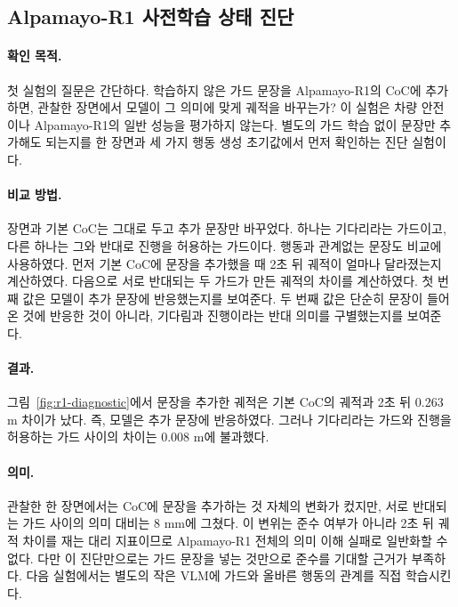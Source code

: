 
\subsection{Alpamayo-R1 사전학습 상태 진단}

\paragraph{확인 목적.}
첫 실험의 질문은 간단하다. 학습하지 않은 가드 문장을 Alpamayo-R1의 CoC에 추가하면, 관찰한 장면에서 모델이 그 의미에 맞게 궤적을 바꾸는가? 이 실험은 차량 안전이나 Alpamayo-R1의 일반 성능을 평가하지 않는다. 별도의 가드 학습 없이 문장만 추가해도 되는지를 한 장면과 세 가지 행동 생성 초기값에서 먼저 확인하는 진단 실험이다.

\paragraph{비교 방법.}
장면과 기본 CoC는 그대로 두고 추가 문장만 바꾸었다. 하나는 기다리라는 가드이고, 다른 하나는 그와 반대로 진행을 허용하는 가드이다. 행동과 관계없는 문장도 비교에 사용하였다. 먼저 기본 CoC에 문장을 추가했을 때 2초 뒤 궤적이 얼마나 달라졌는지 계산하였다. 다음으로 서로 반대되는 두 가드가 만든 궤적의 차이를 계산하였다. 첫 번째 값은 모델이 추가 문장에 반응했는지를 보여준다. 두 번째 값은 단순히 문장이 들어온 것에 반응한 것이 아니라, 기다림과 진행이라는 반대 의미를 구별했는지를 보여준다.

\paragraph{결과.}
그림~\ref{fig:r1-diagnostic}에서 문장을 추가한 궤적은 기본 CoC의 궤적과 2초 뒤 0.263 m 차이가 났다. 즉, 모델은 추가 문장에 반응하였다. 그러나 기다리라는 가드와 진행을 허용하는 가드 사이의 차이는 0.008 m에 불과했다.

\paragraph{의미.}
관찰한 한 장면에서는 CoC에 문장을 추가하는 것 자체의 변화가 컸지만, 서로 반대되는 가드 사이의 의미 대비는 8 mm에 그쳤다. 이 변위는 준수 여부가 아니라 2초 뒤 궤적 차이를 재는 대리 지표이므로 Alpamayo-R1 전체의 의미 이해 실패로 일반화할 수 없다. 다만 이 진단만으로는 가드 문장을 넣는 것만으로 준수를 기대할 근거가 부족하다. 다음 실험에서는 별도의 작은 VLM에 가드와 올바른 행동의 관계를 직접 학습시킨다.

